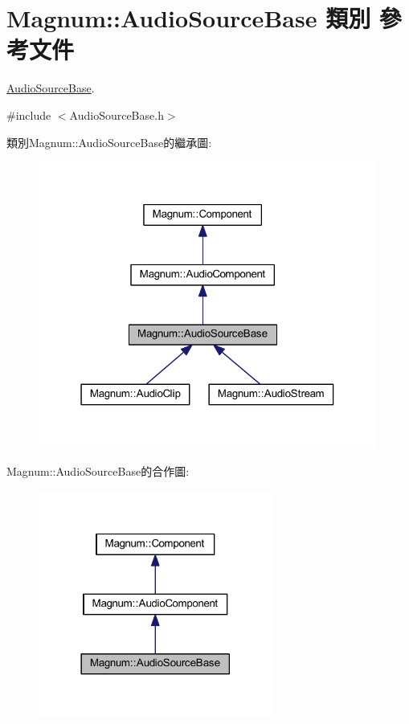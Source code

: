 \hypertarget{class_magnum_1_1_audio_source_base}{}\section{Magnum\+:\+:Audio\+Source\+Base 類別 參考文件}
\label{class_magnum_1_1_audio_source_base}


\hyperlink{class_magnum_1_1_audio_source_base}{Audio\+Source\+Base}.  




{\ttfamily \#include $<$Audio\+Source\+Base.\+h$>$}



類別\+Magnum\+:\+:Audio\+Source\+Base的繼承圖\+:\nopagebreak
\begin{figure}[H]
\begin{center}
\leavevmode
\includegraphics[width=316pt]{class_magnum_1_1_audio_source_base__inherit__graph}
\end{center}
\end{figure}


Magnum\+:\+:Audio\+Source\+Base的合作圖\+:\nopagebreak
\begin{figure}[H]
\begin{center}
\leavevmode
\includegraphics[width=218pt]{class_magnum_1_1_audio_source_base__coll__graph}
\end{center}
\end{figure}
